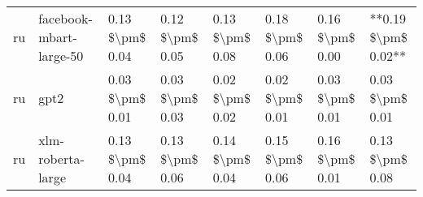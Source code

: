 \begin{tabular}{llllllll}
      ru &            facebook-mbart-large-50 & 0.13 \$\textbackslash pm\$ 0.04 &           0.12 \$\textbackslash pm\$ 0.05 &       0.13 \$\textbackslash pm\$ 0.08 &        0.18 \$\textbackslash pm\$ 0.06 &                         0.16 \$\textbackslash pm\$ 0.00 & **0.19 \$\textbackslash pm\$ 0.02** \\
      ru &                               gpt2 & 0.03 \$\textbackslash pm\$ 0.01 &           0.03 \$\textbackslash pm\$ 0.03 &       0.02 \$\textbackslash pm\$ 0.02 &        0.02 \$\textbackslash pm\$ 0.01 &                         0.03 \$\textbackslash pm\$ 0.01 &     0.03 \$\textbackslash pm\$ 0.01 \\
      ru &                  xlm-roberta-large & 0.13 \$\textbackslash pm\$ 0.04 &           0.13 \$\textbackslash pm\$ 0.06 &       0.14 \$\textbackslash pm\$ 0.04 &        0.15 \$\textbackslash pm\$ 0.06 &                         0.16 \$\textbackslash pm\$ 0.01 &     0.13 \$\textbackslash pm\$ 0.08 \\
\bottomrule
\end{tabular}

